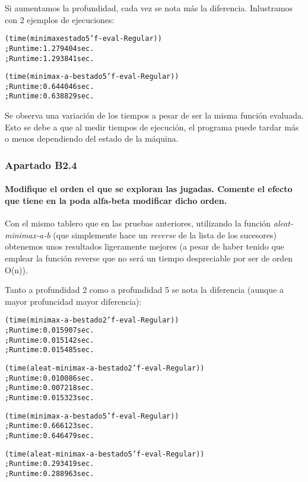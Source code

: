 \documentclass[nochap]{apuntes}
\begin{document}
Si aumentamos la profundidad, cada vez se nota más la diferencia. Inlustramos con 2 ejemplos de ejecuciones:

\begin{alltt}
(time (minimax estado 5 'f-eval-Regular)) 
  ; Run time: 1.279404 sec.
  ; Run time: 1.293841 sec.

(time (minimax-a-b estado 5 'f-eval-Regular)) 
  ; Run time: 0.644046 sec.
  ; Run time: 0.638829 sec.

\end{alltt}

Se observa una variación de los tiempos a pesar de ser la misma función evaluada. Esto se debe a que al medir tiempos de ejecución, el programa puede tardar más o menos dependiendo del estado de la máquina.

\subsubsection*{Apartado B2.4}
\paragraph{ Modifique el orden el que se exploran las jugadas. Comente el efecto que tiene en la poda alfa-beta modificar dicho orden.}

Con el mismo tablero que en las pruebas anteriores, utilizando la función \textit{aleat-minimax-a-b} (que simplemente hace un \textit{reverse} de la lista de los sucesores) obtenemos unos resultados ligeramente mejores (a pesar de haber tenido que emplear la función reverse que no será un tiempo despreciable por ser de orden O(n)).

Tanto a profundidad 2 como a profundidad 5 se nota la diferencia (aunque a mayor profuncidad mayor diferencia):

\begin{alltt}
(time (minimax-a-b estado 2 'f-eval-Regular)) 
  ; Run time: 0.015907 sec.
  ; Run time: 0.015142 sec.
  ; Run time: 0.015485 sec.

(time (aleat-minimax-a-b estado 2 'f-eval-Regular)) 
  ; Run time: 0.010086 sec.
  ; Run time: 0.007218 sec.
  ; Run time: 0.015323 sec.

(time (minimax-a-b estado 5 'f-eval-Regular)) 
  ; Run time: 0.666123 sec.
  ; Run time: 0.646479 sec.

(time (aleat-minimax-a-b estado 5 'f-eval-Regular)) 
  ; Run time: 0.293419 sec.
  ; Run time: 0.288963 sec.
\end{alltt}
\end{document}
